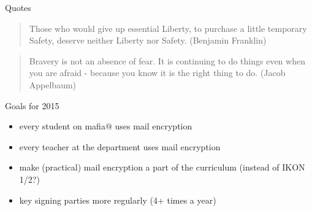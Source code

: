 \documentclass{beamer}
\begin{document}
	\begin{frame}{Quotes}
		\begin{quotation}
			Those who would give up essential Liberty, to purchase a little temporary Safety, deserve neither Liberty nor Safety. (Benjamin Franklin)
		\end{quotation}
		
		\begin{quotation}
			Bravery is not an absence of fear. It is continuing to do things even when you are afraid - because you know it is the right thing to do. (Jacob Appelbaum)
		\end{quotation}
	\end{frame}
	
	\begin{frame}{Goals for 2015}
		\begin{itemize}
			\item every student on mafia@ uses mail encryption
			\item every teacher at the department uses mail encryption
			\item make (practical) mail encryption a part of the curriculum (instead of IKON 1/2?)
			\item key signing parties more regularly (4+ times a year) 
		\end{itemize}
	\end{frame}
\end{document}
